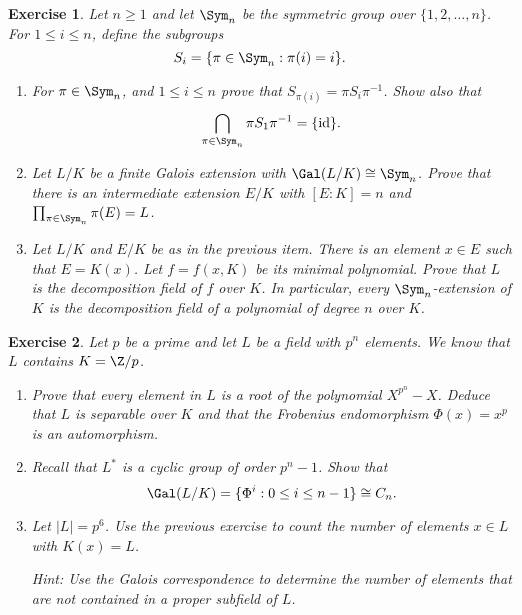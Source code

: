 \documentclass[a4paper,10pt,reqno]{amsart}
\newtheorem{ex}{Exercise}[section]
\begin{document}
\begin{ex}
\label{8.3}
Let $n \geq 1$ and let $\Sym_n$ be the symmetric group over $\{1, 2, \ldots, n \}$. For $1 \leq i \leq n$, define the subgroups
\[
S_i = \{ \pi \in \Sym_n : \pi(i) = i \}.
\]
\begin{enumerate}[label=(\roman*)]
\item For $\pi \in \Sym_n$, and $1 \leq i \leq n$ prove that $S_{\pi(i)} = \pi S_i\pi^{-1}$. Show also that
\[
\bigcap_{\pi \in \Sym_n} \pi S_1\pi^{-1} = \{ \mathrm{id} \}.
\]
\item Let $L/K$ be a finite Galois extension with $\Gal(L/K) \cong \Sym_n$. Prove that there is an intermediate extension $E/K$ with $[E:K] = n$ and $\prod_{\pi \in \Sym_n} \pi(E) = L$.
\item Let $L/K$ and $E/K$ be as in the previous item. There is an element $x \in E$ such that $E = K(x)$. Let $f = f(x,K)$ be its minimal polynomial. Prove that $L$ is the decomposition field of $f$ over $K$. In particular, every $\Sym_n$-extension of $K$ is the decomposition field of a polynomial of degree $n$ over $K$.
\end{enumerate}

\end{ex}

\begin{ex}
\label{8.4}
    Let $p$ be a prime and let $L$ be a field with $p^n$ elements. We know that $L$ contains $K = \Z/p$.
\begin{enumerate}[label=(\roman*)]
\item Prove that every element in $L$ is a root of the polynomial $X^{p^n} - X$. Deduce that $L$ is separable over $K$ and that the Frobenius endomorphism $\Phi(x) = x^p$ is an automorphism.
\item Recall that $L^{\ast}$ is a cyclic group of order $p^n-1$. Show that 
$$\Gal(L/K) = \{ \Phi^i : 0 \leq i \leq n-1 \} \cong C_n.$$
\item Let $|L| = p^6$. Use the previous exercise to count the number of elements $x \in L$ with $K(x) = L$.

\noindent \textit{Hint:} Use the Galois correspondence to determine the number of elements that are not contained in a proper subfield of $L$.
\end{enumerate} 
\end{ex}



\newpage
\end{document}

